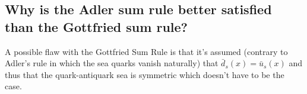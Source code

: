 \documentclass[10pt,a4paper,twoside]{article}
\begin{document}
\subsection{Why is the Adler sum rule better satisfied than the Gottfried sum rule?}
A possible flaw with the Gottfried Sum Rule is that it's assumed (contrary to Adler's rule in which the sea quarks vanish naturally) that $\bar{d}_s(x) = \bar{u}_s(x)$ and thus that the quark-antiquark sea is symmetric which doesn't have to be the case.


\end{document}
